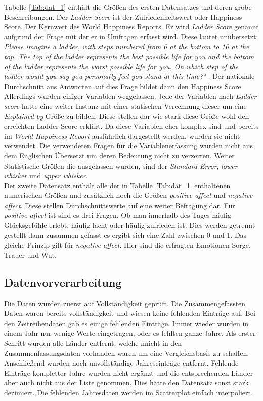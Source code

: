 Tabelle \ref{Tab:dat_1} enthält die Größen des ersten Datensatzes und deren grobe Beschreibungen. Der \textit{Ladder Score} ist der Zufriedenheitswert oder Happiness Score. Der Kernwert des World Happiness Reports. Er wird \textit{Ladder Score} genannt aufgrund der Frage mit der er in Umfragen erfasst wird. Diese lautet unübersetzt: \textit{Please imagine a ladder, with steps numbered from 0 at the
bottom to 10 at the top. The top of the ladder represents the best possible life
for you and the bottom of the ladder represents the worst possible life for you.
On which step of the ladder would you say you personally feel you stand at this
time?"} \cite{helliwell_world_2021}. Der nationale Durchschnitt aus Antworten auf dies Frage bildet dann den Happiness Score. \\

Allerdings wurden einiger Variablen weggelassen. Jede der Variablen nach \textit{Ladder score} hatte eine weiter Instanz mit einer statischen Verechnung dieser um eine \textit{Explained by} Größe zu bilden. Diese stellen dar wie stark diese Größe wohl den erreichten Ladder Score erklärt. Da diese Variablen eher komplex sind und bereits im \textit{World Happiness Report}  ausführlich dargestellt werden, wurden sie nicht verwendet. Die verwendeten Fragen für die Variablenerfassung wurden nicht aus dem Englischen Übersetzt um deren Bedeutung nicht zu verzerren. Weiter Statistische Größen die ausgelassen wurden, sind der \textit{Standard Error}, \textit{lower whisker} und \textit{upper whisker}. \\

Der zweite Datensatz enthält alle der in Tabelle \ref{Tab:dat_1} enthaltenen numerischen Größen und zusätzlich noch die Größen \textit{positive affect} und \textit{negative affect}. Diese stellen Durchschnittswerte auf eine weiter Befragung dar. Für \textit{positive affect} ist sind es drei Fragen. Ob man innerhalb des Tages häufig Glücksgefühle erlebt, häufig lacht oder häufig zufrieden ist. Dies werden getrennt gestellt dann zusammen gefasst es ergibt sich eine Zahl zwischen 0 und 1. Das gleiche Prinzip gilt für \textit{negative affect}. Hier sind die erfragten Emotionen Sorge, Trauer und Wut. 

\subsection{Datenvorverarbeitung}

Die Daten wurden zuerst auf Vollständigkeit geprüft. Die Zusammengefassten Daten waren bereits vollständigkeit und wiesen keine fehlenden Einträge auf. Bei den Zeitreihendaten gab es einige fehlenden Einträge. Immer wieder wurden in einem Jahr nur wenige Werte eingetragen, oder es fehlten ganze Jahre. Als erster Schritt wurden alle Länder entfernt, welche nnicht in den Zusammenfassungsdaten vorhanden waren um eine Vergleichsbasis zu schaffen. Anschließend wurden noch unvollständige Jahreseinträge entfernt. Fehlende Einträge kompletter Jahre wurden nicht ergänzt und die entsprechenden Länder aber auch nicht aus der Liste genommen. Dies hätte den Datensatz sonst stark dezimiert. Die fehlenden Jahresdaten werden im Scatterplot einfach interpoliert. \\

